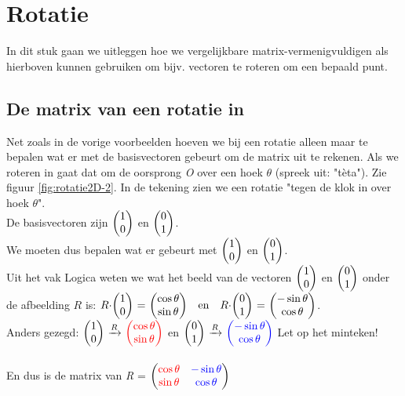 \section{Rotatie}		
In dit stuk gaan we uitleggen hoe we vergelijkbare matrix-vermenigvuldigen als hierboven kunnen gebruiken om bijv. vectoren te roteren om een bepaald punt.

\label{rotatie}
\subsection{De matrix van een rotatie in \RT}
Net zoals in de vorige voorbeelden hoeven we bij een rotatie alleen maar te bepalen wat er met de basisvectoren gebeurt om de matrix uit te rekenen. 
Als we roteren in \RT gaat dat om de oorsprong \textit{O} over een hoek $\theta$ (spreek uit: "tèta"). Zie figuur  \ref{fig:rotatie2D-2}. In de tekening zien we een rotatie "tegen de klok in over hoek $\theta$". \\De basisvectoren zijn $ \vectwee{1}{0}   $ en   $ \vectwee{0}{1}   $. \\We moeten dus bepalen wat er gebeurt met $ \vectwee{1}{0}   $ en   $ \vectwee{0}{1}   $.\\
Uit het vak Logica weten we wat het beeld van de vectoren $\vectwee{1}{0} $ en $\vectwee{0}{1} $ onder de afbeelding $R$ is: $ R \cdot \vectwee{1}{0}  \  = \  \vectwee{\cos \theta}{\sin \theta} \ \ \text{ en } \ \  R \cdot \vectwee{0}{1}  \  = \  \vectwee{-\sin \theta}{\cos \theta} $. \\ Anders gezegd: 
$ \vectwee{1}{0}   \  \xrightarrow{R}  \ \vectwee[red]{\cos \theta}{\sin \theta} $  \quad en  \quad 
$ \vectwee{0}{1}   \  \xrightarrow{R}  \ \vectwee[blue]{-\sin \theta}{\cos \theta} $  \quad Let op het minteken!\\ \\
En dus is de matrix van \textit{R} =  
$  \begin{pmatrix}  {\color{red}\cos \theta} & {\color{blue}-\sin \theta}  \\  {\color{red}\sin \theta} & {\color{blue}\cos \theta} \end{pmatrix} $\\ \\ \\


